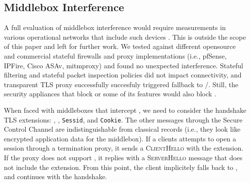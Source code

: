 

\subsection{Middlebox Interference}
\label{sec:middlebox}

A full evaluation of middlebox interference would require measurements in various operational 
networks that include such devices \cite{honda2011still,raman2020measuring,o2016tls}. This is 
outside the scope of this paper and left for further work.
We tested \tcpls against different opensource and commercial stateful
firewalls and proxy implementations (i.e., pfSense, IPFire, Cisco ASAv,
mitmproxy) and found no unexpected interference. Stateful filtering and stateful
packet inspection policies did not impact connectivity, and transparent TLS proxy
successfully succesfuly triggered \tcpls fallback to \tls/\tcp. Still, the security
appliances that block  or some of its features 
\cite{lee2019matls,Bock_China,raman2020measuring} would also block \tcpls.

When faced with middleboxes that intercept 
\cite{Bock_China,raman2020measuring}, we need to consider the \tcpls handshake
TLS extensions: \tcpls, \join, \texttt{Sessid}, and \texttt{Cookie}. The other
\tcpls messages through the Secure Control Channel are indistinguishable from
classical \tls records (i.e., they look like encrypted application data
for the middlebox). If a clients attempts to open a \tcpls session
through a \tls termination proxy, it sends a \textsc{ClientHello} with the
\tcpls extension. If the proxy does not support \tcpls, it replies with a
\textsc{ServerHello} message that does not include the \tcpls extension. From
this point, the client implicitely falls back to \tls, and continues with the
handshake.

